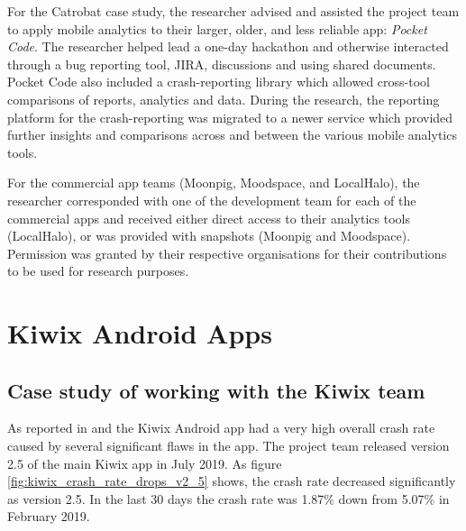 For the Catrobat case study, the researcher advised and assisted the project team to apply mobile analytics to their larger, older, and less reliable app: \emph{Pocket Code}. The researcher helped lead a one-day hackathon and otherwise interacted through a bug reporting tool, JIRA, discussions and using shared documents. Pocket Code also included a crash-reporting library which allowed cross-tool comparisons of reports, analytics and data. During the research, the reporting platform for the crash-reporting was migrated to a newer service which provided further insights and comparisons across and between the various mobile analytics tools.

For the commercial app teams (Moonpig, Moodspace, and LocalHalo), the researcher corresponded with one of the development team for each of the commercial apps and received either direct access to their analytics tools (LocalHalo), or was provided with snapshots (Moonpig and Moodspace). Permission was granted by their respective organisations for their contributions to be used for research purposes.

\section{Kiwix Android Apps}
\subsection{Case study of working with the Kiwix team}
As reported in \cite{harty_google_play_console_insightful_development_using_android_vitals_and_pre_launch_reports} and \cite{harty_better_android_apps_using_android_vitals} the Kiwix Android app had a very high overall crash rate caused by several significant flaws in the app. The project team released version 2.5 of the main Kiwix app in July 2019. As figure \ref{fig:kiwix_crash_rate_drops_v2_5} shows, the crash rate decreased significantly as version 2.5. In the last 30 days the crash rate was 1.87\% down from 5.07\% in February 2019.

